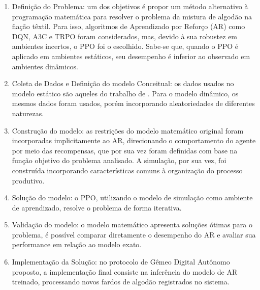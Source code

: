 \documentclass[
    12pt,                %
    openright,           %
    oneside,             %
    a4paper,             %
    english,             %
    spanish,             %
    brazil               %
]{ufscar}
\begin{document}
\begin{enumerate}
    \item Definição do Problema: um dos objetivos é propor um método alternativo à programação matemática para resolver o problema da mistura de algodão na fiação têxtil. Para isso, algoritmos de Aprendizado por Reforço (AR) como DQN, A3C e TRPO foram considerados, mas, devido à sua robustez em ambientes incertos, o PPO foi o escolhido. Sabe-se que, quando o PPO é aplicado em ambientes estáticos, seu desempenho é inferior ao observado em ambientes dinâmicos.

    \item Coleta de Dados e Definição do modelo Conceitual: os dados usados no modelo estático são aqueles do trabalho de . Para o modelo dinâmico, os mesmos dados foram usados, porém incorporando aleatoriedades de diferentes naturezas. 
    
    \item Construção do modelo: as restrições do modelo matemático original foram incorporadas implicitamente ao AR, direcionando o comportamento do agente por meio das recompensas, que por sua vez foram definidas com base na função objetivo do problema analisado. A simulação, por sua vez, foi construída incorporando características comuns à organização do processo produtivo.
    
    \item Solução do modelo: o PPO, utilizando o modelo de simulação como ambiente de aprendizado, resolve o problema de forma iterativa.
    
    \item Validação do modelo: o modelo matemático apresenta soluções ótimas para o problema, é possível comparar diretamente o desempenho do AR e avaliar sua performance em relação ao modelo exato.
    
    \item Implementação da Solução: no protocolo de Gêmeo Digital Autônomo proposto, a implementação final consiste na inferência do modelo de AR treinado, processando novos fardos de algodão registrados no sistema.
\end{enumerate}
\end{document}
